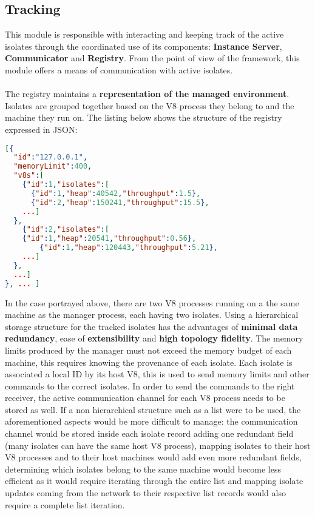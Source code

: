 \documentclass{l4proj}
\begin{document}
\subsection{Tracking} \label{Design:Tracking}
\hspace*{1em} This module is responsible with interacting and keeping track of the active isolates through the coordinated use of its components: \textbf{Instance Server}, \textbf{Communicator} and \textbf{Registry}. From the point of view of the framework, this module offers a means of communication with active isolates.
\\\\
\hspace*{1em} The registry maintains a \textbf{representation of the managed environment}. Isolates are grouped together based on the V8 process they belong to and the machine they run on. The listing below shows the structure of the registry expressed in JSON:
\begin{lstlisting}[language=json,firstnumber=1]
[{
  "id":"127.0.0.1",
  "memoryLimit":400,
  "v8s":[
    {"id":1,"isolates":[
      {"id":1,"heap":40542,"throughput":1.5},
      {"id":2,"heap":150241,"throughput":15.5},
    ...]
  },
    {"id":2,"isolates":[
    {"id":1,"heap":20541,"throughput":0.56},
        {"id":1,"heap":120443,"throughput":5.21},
    ...]
  },
  ...]
}, ... ]
\end{lstlisting}
In the case portrayed above, there are two V8 processes running on a the same machine as the manager process, each having two isolates. Using a hierarchical storage structure for the tracked isolates has the advantages of \textbf{minimal data redundancy}, ease of \textbf{extensibility} and \textbf{high topology fidelity}. The memory limits produced by the manager must not exceed the memory budget of each machine, this requires knowing the provenance of each isolate. Each isolate is associated a local ID by its host V8, this is used to send memory limits and other commands to the correct isolates. In order to send the commands to the right receiver, the active communication channel for each V8 process needs to be stored as well. If a non hierarchical structure such as a list were to be used, the aforementioned aspects would be more difficult to manage: the communication channel would be stored inside each isolate record adding one redundant field (many isolates can have the same host V8 process), mapping isolates to their host V8 processes and to their host machines would add even more redundant fields, determining which isolates belong to the same machine would become less efficient as it would require iterating through the entire list and mapping isolate updates coming from the network to their respective list records would also require a complete list iteration.
\end{document}

